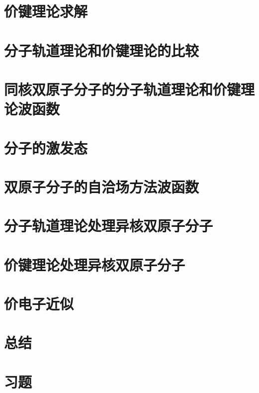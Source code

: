 \section{价键理论求解}
\label{sec:13.10 The Valence-Bond Treatment of H2}

\section{分子轨道理论和价键理论的比较}
\label{sec:13.11 Comparison of the MO and VB Theories}

\section{同核双原子分子的分子轨道理论和价键理论波函数}
\label{sec:13.12 MO and VB Wave Functions for Homonuclear Diatomic Molecules}

\section{分子的激发态}
\label{sec:13.13 Excited States of H2}

\section{双原子分子的自洽场方法波函数}
\label{sec:13.14 SCF Wave Functions for Diatomic Molecules}

\section{分子轨道理论处理异核双原子分子}
\label{sec:13.15 MO Treatment of Heteronuclear Diatomic Molecules}

\section{价键理论处理异核双原子分子}
\label{sec:13.16 VB Treatment of Heteronuclear Diatomic Molecules}

\section{价电子近似}
\label{sec:13.17 The Valence-Electron Approximation}

\section*{总结}

\section*{习题}